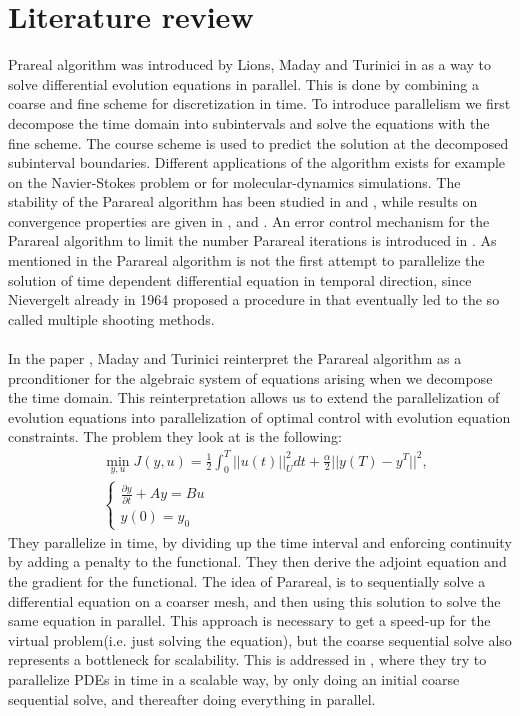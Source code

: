 \chapter{Literature review}
Prareal algorithm was introduced by Lions, Maday and Turinici in \cite{lions2001resolution} as a way to solve differential evolution equations in parallel. This is done by combining a coarse and fine scheme for discretization in time. To introduce parallelism we first decompose the time domain into subintervals and solve the equations with the fine scheme. The course scheme is used to predict the solution at the decomposed subinterval boundaries. Different applications of the algorithm exists for example on the Navier-Stokes problem\cite{fischer2005parareal} or for molecular-dynamics simulations\cite{baffico2002parallel}. The stability of the Parareal algorithm has been studied in \cite{staff2005stability} and \cite{bal2005convergence}, while results on convergence properties are given in \cite{lions2001resolution},\cite{bal2005convergence} and \cite{gander2007superlinear}. An error control mechanism for the Parareal algorithm to limit the number Parareal iterations is introduced in \cite{lepsa2010efficient}. As mentioned in \cite{gander2007superlinear} the Parareal algorithm is not the first attempt to parallelize the solution of time dependent differential equation in temporal direction, since Nievergelt already in 1964 proposed a procedure in \cite{nievergelt1964parallel} that eventually led to the so called multiple shooting methods.
\\
\\
In the paper \cite{maday2002parareal}, Maday and Turinici reinterpret the Parareal algorithm as a prconditioner for the algebraic system of equations arising when we decompose the time domain. This reinterpretation allows us to extend the parallelization of evolution equations into parallelization of optimal control with evolution equation constraints. The problem they look at is the following:
\begin{align*}
&\min_{y,u}J(y,u) = \frac{1}{2}\int_0^T||u(t)||_U^2dt + \frac{\alpha}{2}||y(T)-y^T||^2,\\
&\left\{
     \begin{array}{lr}
       	\frac{\partial y}{\partial t}+Ay = Bu\\
       	   y(0)=y_0
     \end{array}
   \right.
\end{align*}
They parallelize in time, by dividing up the time interval and enforcing continuity by adding a penalty to the functional. They then derive the adjoint equation and the gradient for the functional. The idea of Parareal, is to sequentially solve a differential equation on a coarser mesh, and then using this solution to solve the same equation in parallel. This approach is necessary to get a speed-up for the virtual problem(i.e. just solving the equation), but the coarse sequential solve also represents a bottleneck for scalability. This is addressed in \cite{rao2014adjoint}, where they try to parallelize PDEs in time in a scalable way, by only doing an initial coarse sequential solve, and thereafter doing everything in parallel.  
